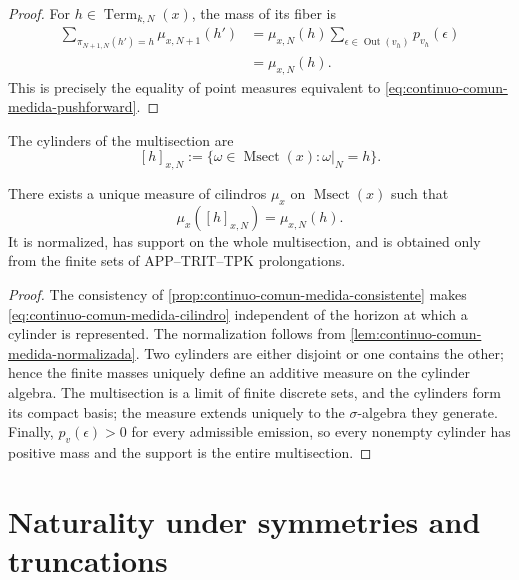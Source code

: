 \begin{proof}
For \(h\in\operatorname{Term}_{k,N}(x)\), the mass of its fiber is
\begin{align*}
 \sum_{\pi_{N+1,N}(h')=h}\mu_{x,N+1}(h')
 &=\mu_{x,N}(h)
   \sum_{\epsilon\in\operatorname{Out}(v_h)}p_{v_h}(\epsilon)\\
 &=\mu_{x,N}(h).
\end{align*}
This is precisely the equality of point measures equivalent to
\eqref{eq:continuo-comun-medida-pushforward}.
\end{proof}

The cylinders of the multisection are
\begin{equation}
\label{eq:continuo-comun-cilindro-msect}
 [h]_{x,N}
 :=\{\omega\in\operatorname{Msect}(x):
       \omega|_N=h\}.
\end{equation}

\begin{theorem}
\label{thm:continuo-comun-medida-canonica}
There exists a unique measure of cilindros \(\mu_x\) on
\(\operatorname{Msect}(x)\) such that
\begin{equation}
\label{eq:continuo-comun-medida-cilindro}
 \mu_x([h]_{x,N})=\mu_{x,N}(h).
\end{equation}
It is normalized, has support on the whole multisection, and is obtained only from
the finite sets of APP--TRIT--TPK prolongations.
\end{theorem}

\begin{proof}
The consistency of \cref{prop:continuo-comun-medida-consistente} makes \eqref{eq:continuo-comun-medida-cilindro} independent of the horizon at which a cylinder is represented. The normalization follows from \cref{lem:continuo-comun-medida-normalizada}. Two cylinders are either disjoint or one contains the other; hence the finite masses uniquely define an additive measure on the cylinder algebra. The multisection is a limit of finite discrete sets, and the cylinders form its compact basis; the measure extends uniquely to the \(\sigma\)-algebra they generate. Finally, \(p_v(\epsilon)>0\) for every admissible emission, so every nonempty cylinder has positive mass and the support is the entire multisection.
\end{proof}

\section{Naturality under symmetries and truncations}
\label{sec:continuo-comun-naturalidad}

